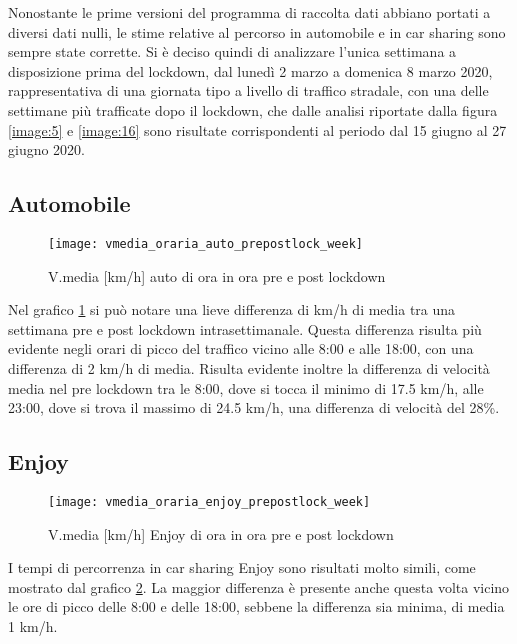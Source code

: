 Nonostante le prime versioni del programma di raccolta dati abbiano portati a diversi dati nulli, le stime relative al percorso in automobile e in car sharing sono sempre state corrette. Si è deciso quindi di analizzare l'unica settimana a disposizione prima del lockdown, dal lunedì 2 marzo a domenica 8 marzo 2020, rappresentativa di una giornata tipo a livello di traffico stradale, con una delle settimane più trafficate dopo il lockdown, che dalle analisi riportate dalla figura \ref{image:5} e \ref{image:16} sono risultate corrispondenti al periodo dal 15 giugno al 27 giugno 2020.

\subsection{Automobile}

\begin{figure}[H]
	\texttt{[image: vmedia\_oraria\_auto\_prepostlock\_week]}
	\caption{V.media [km/h] auto di ora in ora pre e post lockdown}
	\label{image:22}
\end{figure}

Nel grafico \ref{image:22} si può notare una lieve differenza di km/h di media tra una settimana pre e post lockdown intrasettimanale. Questa differenza risulta più evidente negli orari di picco del traffico vicino alle 8:00 e alle 18:00, con una differenza di 2 km/h di media. Risulta evidente inoltre la differenza di velocità media nel pre lockdown tra le 8:00, dove si tocca il minimo di 17.5 km/h, alle 23:00, dove si trova il massimo di 24.5 km/h, una differenza di velocità del 28\%.

\subsection{Enjoy}

\begin{figure}[H]
	\texttt{[image: vmedia\_oraria\_enjoy\_prepostlock\_week]}
	\caption{V.media [km/h] Enjoy di ora in ora pre e post lockdown}
	\label{image:24}
\end{figure}

I tempi di percorrenza in car sharing Enjoy sono risultati molto simili, come mostrato dal grafico \ref{image:24}. La maggior differenza è presente anche questa volta vicino le ore di picco delle 8:00 e delle 18:00, sebbene la differenza sia minima, di media 1 km/h.













